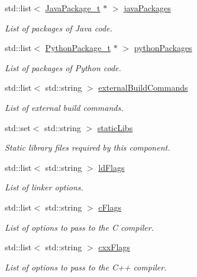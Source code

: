 \begin{DoxyCompactItemize}
std\+::list$<$ \hyperlink{struct_java_package__t}{Java\+Package\+\_\+t} $\ast$ $>$ \hyperlink{struct_component__t_ac38c40670b28c61ebcf208d455fa9a8d}{java\+Packages}
\begin{DoxyCompactList}\small\item\em List of packages of Java code. \end{DoxyCompactList}\item 
std\+::list$<$ \hyperlink{struct_python_package__t}{Python\+Package\+\_\+t} $\ast$ $>$ \hyperlink{struct_component__t_a18527ba203b726174899273ef4a458eb}{python\+Packages}
\begin{DoxyCompactList}\small\item\em List of packages of Python code. \end{DoxyCompactList}\item 
std\+::list$<$ std\+::string $>$ \hyperlink{struct_component__t_a9334c55b61e6e7dba65405ede7b2f338}{external\+Build\+Commands}
\begin{DoxyCompactList}\small\item\em List of external build commands. \end{DoxyCompactList}\item 
std\+::set$<$ std\+::string $>$ \hyperlink{struct_component__t_a661917642d4fe62c1b3b22718346e365}{static\+Libs}
\begin{DoxyCompactList}\small\item\em Static library files required by this component. \end{DoxyCompactList}\item 
std\+::list$<$ std\+::string $>$ \hyperlink{struct_component__t_aff938a859dca5d5372cf9304b33823fd}{ld\+Flags}
\begin{DoxyCompactList}\small\item\em List of linker options. \end{DoxyCompactList}\item 
std\+::list$<$ std\+::string $>$ \hyperlink{struct_component__t_a4b8e64eb72dfe75efdd8c1f5547eff53}{c\+Flags}
\begin{DoxyCompactList}\small\item\em List of options to pass to the C compiler. \end{DoxyCompactList}\item 
std\+::list$<$ std\+::string $>$ \hyperlink{struct_component__t_aa9e6663dc71605bbd07a8bc0c2ad3ddf}{cxx\+Flags}
\begin{DoxyCompactList}\small\item\em List of options to pass to the C++ compiler. \end{DoxyCompactList}\item 

\end{DoxyCompactItemize}

